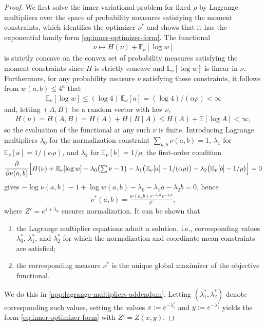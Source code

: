 \documentclass[11pt]{amsart}
\numberwithin{equation}{section}
\numberwithin{equation}{section}
\newcommand{\1}{\mathbbm{1}}
\newcommand{\E}{\mathbb{E}}
\theoremstyle{definition}
\begin{document}
\begin{proof}
    We first solve the inner variational problem for fixed $\rho$ by Lagrange multipliers over the space of probability measures satisfying the moment constraints, which identifies the optimizer $\nu^*$ and shows that it has the exponential family form \eqref{eq:inner-optimizer-form}. The functional 
    \begin{align*}
        \nu\mapsto H(\nu)+\E_\nu[\log w]
    \end{align*}
    is strictly concave on the convex set of probability measures satisfying the moment constraints since $H$ is strictly concave and $\E_\nu[\log w]$ is linear in $\nu$. Furthermore, for any probability measure $\nu$ satisfying these constraints, it follows from $w(a,b) \leq 4^a$ that
    \begin{align*}
        \E_\nu[\log w] \leq (\log 4)\,\E_\nu[a] = (\log 4)/(\alpha\rho) < \infty
    \end{align*}
    and, letting $(A,B)$ be a random vector with law $\nu$,
    \begin{align*}
        H(\nu) = H(A,B) = H(A) + H(B \mid A) \leq H(A) + \E\left[ \log A \right] < \infty,
    \end{align*}
    so the evaluation of the functional at any such $\nu$ is finite. Introducing Lagrange multipliers $\lambda_0$ for the normalization constraint $\sum_{a,b}\nu(a,b)=1$, $\lambda_1$ for $\E_\nu[a]=1/(\alpha\rho)$, and $\lambda_2$ for $\E_\nu[b]=1/\rho$, the first-order condition
    \begin{align*}
        \frac{\partial}{\partial\nu(a,b)} \Bigl[H(\nu)+\E_\nu[\log w]-\lambda_0\bigl(\textstyle\sum\nu-1\bigr) -\lambda_1\bigl(\E_\nu[a]-1/(\alpha\rho)\bigr)-\lambda_2\bigl(\E_\nu[b]-1/\rho\bigr)\Bigr]=0
    \end{align*}
    gives $-\log\nu(a,b)-1+\log w(a,b)-\lambda_0-\lambda_1 a-\lambda_2 b=0$, hence
    \begin{align*}
        \nu^*(a,b)=\frac{w(a,b)\,e^{-\lambda_1 a}\,e^{-\lambda_2 b}}{Z'},
    \end{align*}
    where $Z'=e^{1+\lambda_0}$ ensures normalization. It can be shown that
    \begin{enumerate}
        \item the Lagrange multiplier equations admit a solution, i.e., corresponding values $\lambda_0^*$, $\lambda_1^*$, and $\lambda_2^*$ for which the normalization and coordinate mean constraints are satisfied;
        \item the corresponding measure $\nu^*$ is the unique global maximizer of the objective functional.
    \end{enumerate}
    We do this in \cref{app:lagrange-multipliers-addendum}. Letting $\left( \lambda_1^*, \lambda_2^* \right)$ denote corresponding such values, setting the values $x:=e^{-\lambda_1^*}$ and $y:=e^{-\lambda_2^*}$ yields the form \eqref{eq:inner-optimizer-form} with $Z'=Z(x,y)$. 
    

\end{proof}
\end{document}
